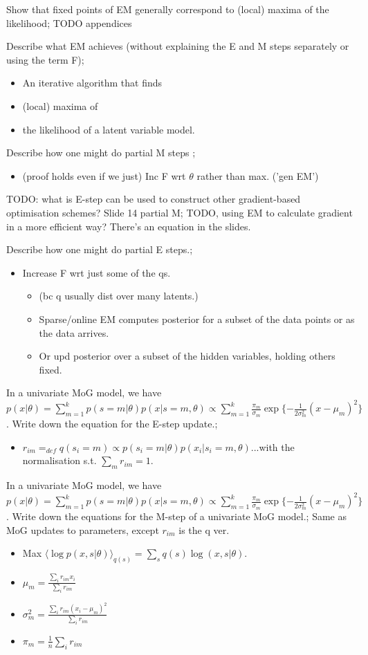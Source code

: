 \documentclass{article}
\begin{document}
Show that fixed points of EM generally correspond to (local) maxima of the likelihood; TODO appendices

Describe what EM achieves (without explaining the E and M steps separately or using the term F); \begin{itemize} \item An iterative algorithm that finds \item (local) maxima of \item the likelihood of a latent variable model.  \end{itemize}

Describe how one might do partial M steps ;\begin{itemize} \item (proof holds even if we just) Inc F wrt $\theta$ rather than max. ('gen EM') \end{itemize}

TODO: what is E-step can be used to construct other gradient-based optimisation schemes? Slide 14 partial M; TODO, using EM to calculate gradient in a more efficient way? There's an equation in the slides.

Describe how one might do partial E steps.; \begin{itemize} \item Increase F wrt just some of the qs. \begin{itemize} \item (bc q usually dist over many latents.) \item Sparse/online EM computes posterior for a subset of the data points or as the data arrives.  \item Or upd posterior over a subset of the hidden variables, holding others fixed.  \end{itemize} \end{itemize}
  
In a univariate MoG model, we have $p(x|\theta)=\sum_{m=1}^k p(s=m|\theta)p(x|s=m, \theta)\propto \sum^k_{m=1}\frac{\pi_m}{\sigma_m}\exp\{-\frac{1}{2\sigma^2_m}(x-\mu_m)^2\}$. Write down the equation for the E-step update.; \begin{itemize} \item $r_{im}=_{def}q(s_i=m)\propto p(s_i=m|\theta)p(x_i|s_i=m,\theta)$...with the normalisation s.t. $\sum_mr_{im}=1$.  \end{itemize}

In a univariate MoG model, we have $p(x|\theta)=\sum_{m=1}^k p(s=m|\theta)p(x|s=m, \theta)\propto \sum^k_{m=1}\frac{\pi_m}{\sigma_m}\exp\{-\frac{1}{2\sigma^2_m}(x-\mu_m)^2\}$. Write down the equations for the M-step of a univariate MoG model.; Same as MoG updates to parameters, except $r_{im}$ is the q ver. \begin{itemize} \item Max $\langle \log p(x,s|\theta) \rangle_{q(s)} = \sum_s q(s)\log (x,s|\theta)$.  \item $\mu_m = \frac{\sum_i r_{im}x_i}{\sum_i r_{im}}$ \item $\sigma^2_m = \frac{\sum_i r_{im}(x_i-\mu_m)^2}{\sum_ir_{im}}$ \item $\pi_m = \frac{1}{n}\sum_ir_{im}$ \end{itemize}
\end{document}
